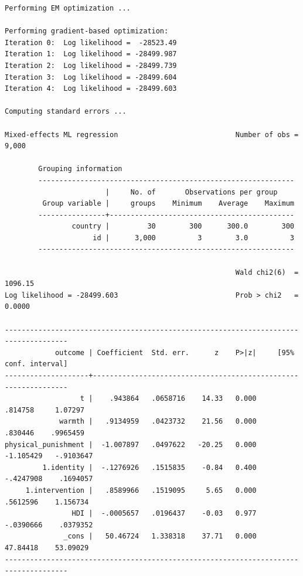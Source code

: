 \documentclass[
  letterpaper,
  DIV=11,
  numbers=noendperiod]{scrreprt}
\begin{document}
\begin{verbatim}
Performing EM optimization ...

Performing gradient-based optimization: 
Iteration 0:  Log likelihood =  -28523.49  
Iteration 1:  Log likelihood = -28499.987  
Iteration 2:  Log likelihood = -28499.739  
Iteration 3:  Log likelihood = -28499.604  
Iteration 4:  Log likelihood = -28499.603  

Computing standard errors ...

Mixed-effects ML regression                            Number of obs =   9,000

        Grouping information
        -------------------------------------------------------------
                        |     No. of       Observations per group
         Group variable |     groups    Minimum    Average    Maximum
        ----------------+--------------------------------------------
                country |         30        300      300.0        300
                     id |      3,000          3        3.0          3
        -------------------------------------------------------------

                                                       Wald chi2(6)  = 1096.15
Log likelihood = -28499.603                            Prob > chi2   =  0.0000

-------------------------------------------------------------------------------------
            outcome | Coefficient  Std. err.      z    P>|z|     [95% conf. interval]
--------------------+----------------------------------------------------------------
                  t |    .943864   .0658716    14.33   0.000      .814758     1.07297
             warmth |   .9134959   .0423732    21.56   0.000      .830446    .9965459
physical_punishment |  -1.007897   .0497622   -20.25   0.000    -1.105429   -.9103647
         1.identity |  -.1276926   .1515835    -0.84   0.400    -.4247908    .1694057
     1.intervention |   .8589966   .1519095     5.65   0.000     .5612596    1.156734
                HDI |  -.0005657   .0196437    -0.03   0.977    -.0390666    .0379352
              _cons |   50.46724   1.338318    37.71   0.000     47.84418    53.09029
-------------------------------------------------------------------------------------


\end{verbatim}
\end{document}
